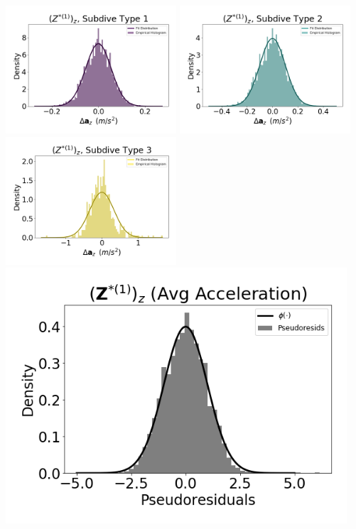 \documentclass[12pt]{TD-CJS}
\begin{document}
\newpage

\includegraphics[width=2.5in]{../Plots/empirical_hist_Az_0.png}
\includegraphics[width=2.5in]{../Plots/empirical_hist_Az_1.png}
\includegraphics[width=2.5in]{../Plots/empirical_hist_Az_2.png}
\includegraphics[width=5in]{../Plots/psedoresids_Az.png}
\end{document}
